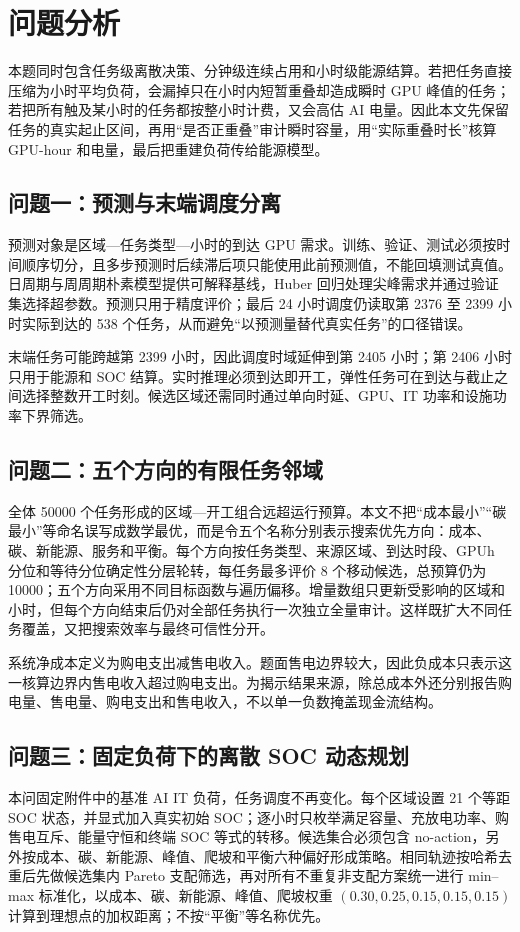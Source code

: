 \section{问题分析}
本题同时包含任务级离散决策、分钟级连续占用和小时级能源结算。若把任务直接压缩为小时平均负荷，会漏掉只在小时内短暂重叠却造成瞬时 GPU 峰值的任务；若把所有触及某小时的任务都按整小时计费，又会高估 AI 电量。因此本文先保留任务的真实起止区间，再用“是否正重叠”审计瞬时容量，用“实际重叠时长”核算 GPU-hour 和电量，最后把重建负荷传给能源模型。

\subsection{问题一：预测与末端调度分离}
预测对象是区域—任务类型—小时的到达 GPU 需求。训练、验证、测试必须按时间顺序切分，且多步预测时后续滞后项只能使用此前预测值，不能回填测试真值。日周期与周周期朴素模型提供可解释基线，Huber 回归处理尖峰需求并通过验证集选择超参数\cite{huber1964robust}。预测只用于精度评价；最后 24 小时调度仍读取第 2376 至 2399 小时实际到达的 538 个任务，从而避免“以预测量替代真实任务”的口径错误。

末端任务可能跨越第 2399 小时，因此调度时域延伸到第 2405 小时；第 2406 小时只用于能源和 SOC 结算。实时推理必须到达即开工，弹性任务可在到达与截止之间选择整数开工时刻。候选区域还需同时通过单向时延、GPU、IT 功率和设施功率下界筛选。

\subsection{问题二：五个方向的有限任务邻域}
全体 50000 个任务形成的区域—开工组合远超运行预算。本文不把“成本最小”“碳最小”等命名误写成数学最优，而是令五个名称分别表示搜索优先方向：成本、碳、新能源、服务和平衡。每个方向按任务类型、来源区域、到达时段、GPUh 分位和等待分位确定性分层轮转，每任务最多评价 8 个移动候选，总预算仍为 10000；五个方向采用不同目标函数与遍历偏移。增量数组只更新受影响的区域和小时，但每个方向结束后仍对全部任务执行一次独立全量审计。这样既扩大不同任务覆盖，又把搜索效率与最终可信性分开。

系统净成本定义为购电支出减售电收入。题面售电边界较大，因此负成本只表示这一核算边界内售电收入超过购电支出。为揭示结果来源，除总成本外还分别报告购电量、售电量、购电支出和售电收入，不以单一负数掩盖现金流结构。

\subsection{问题三：固定负荷下的离散 SOC 动态规划}
本问固定附件中的基准 AI IT 负荷，任务调度不再变化。每个区域设置 21 个等距 SOC 状态，并显式加入真实初始 SOC；逐小时只枚举满足容量、充放电功率、购售电互斥、能量守恒和终端 SOC 等式的转移。候选集合必须包含 no-action，另外按成本、碳、新能源、峰值、爬坡和平衡六种偏好形成策略。相同轨迹按哈希去重后先做候选集内 Pareto 支配筛选，再对所有不重复非支配方案统一进行 min--max 标准化，以成本、碳、新能源、峰值、爬坡权重 $(0.30,0.25,0.15,0.15,0.15)$ 计算到理想点的加权距离；不按“平衡”等名称优先\cite{miettinen1999nonlinear}。

